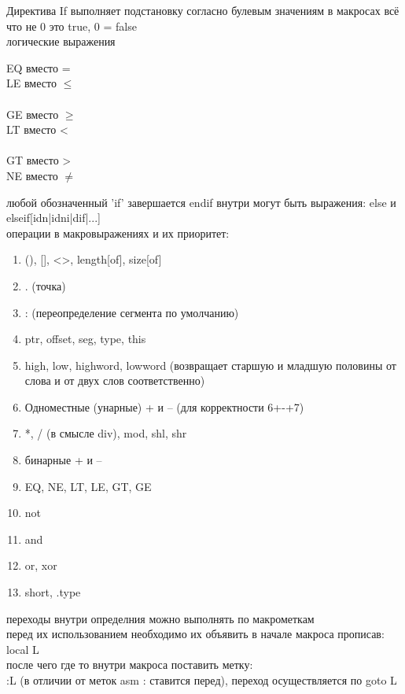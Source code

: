 \documentclass[a4paper,10pt]{article}
\begin{document}
Директива If выполняет подстановку согласно булевым значениям в макросах всё что не 0 это true, 0 = false \\
логические выражения \\
\begin{multicols}{3}
    \noindent
    EQ вместо =\\
    LE вместо $\le$ \\
    \columnbreak \\
    GE вместо $\ge$ \\
    LT вместо < \\
    \columnbreak \\
    GT вместо >\\
    NE вместо $\ne$ \\
\end{multicols}
любой обозначенный 'if' завершается endif внутри могут быть выражения: else и elseif[idn|idni|dif|...] \\
операции в макровыражениях и их приоритет:
\begin{enumerate}
    \item (), [], <>, length[of], size[of]
    \item . (точка)
    \item : (переопределение сегмента по умолчанию)
    \item  ptr, offset, seg, type, this
    \item high, low, highword, lowword (возвращает старшую и младшую половины от слова и от двух слов соответственно) 
    \item Одноместные (унарные) + и – (для корректности 6+-+7)
    \item *, / (в смысле div), mod, shl, shr
    \item бинарные + и –
    \item EQ, NE, LT, LE, GT, GE
    \item not
    \item and
    \item or, xor
    \item short, .type
\end{enumerate}
переходы внутри определния можно выполнять по макрометкам \\
перед их использованием необходимо их объявить в начале макроса прописав:
local L \\
после чего где то внутри макроса поставить метку: \\
:L (в отличии от меток asm : ставится перед), переход осуществляется по goto L\par
\end{document}
